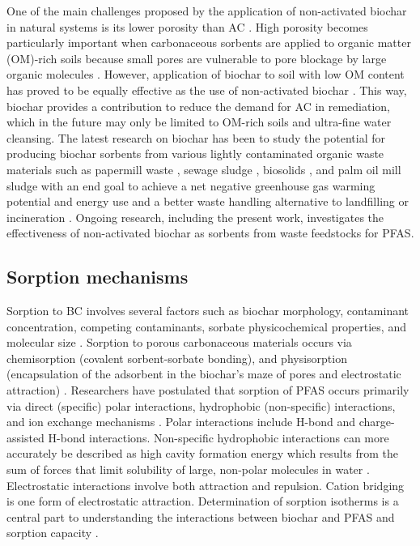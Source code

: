 One of the main challenges proposed by the application of non-activated biochar in natural systems is its lower porosity than AC \citep{leng2021overview}. High porosity becomes particularly important when carbonaceous sorbents are applied to organic matter (\acrshort{OM})-rich soils because small pores are vulnerable to pore blockage by large organic molecules \citep{Sorengard2019}. However, application of biochar to soil with low OM content has proved to be equally effective as the use of non-activated biochar \citep{Alhashimi2017}. This way, biochar provides a contribution to reduce the demand for AC in remediation, which in the future may only be limited to OM-rich soils and ultra-fine water cleansing. The latest research on biochar has been to study the potential for producing biochar sorbents from various lightly contaminated organic waste materials such as papermill waste \citep{van2010effects}, sewage sludge \citep{fathianpour2018lead}, biosolids \citep{wang2011}, and palm oil mill sludge \citep{lam2017adsorption} with an end goal to achieve a net negative greenhouse gas warming potential and energy use and a better waste handling alternative to landfilling or incineration \citep{Alhashimi2017}. Ongoing research, including the present work, investigates the effectiveness of non-activated biochar as sorbents from waste feedstocks for PFAS. 

\subsection{Sorption mechanisms}\label{sec:mechanisms}
Sorption to \acrshort{BC} involves several factors such as biochar morphology, contaminant concentration, competing contaminants, sorbate physicochemical properties, and molecular size \citep{Li2019,du2014adsorption}. Sorption to porous carbonaceous materials occurs via chemisorption (covalent sorbent-sorbate bonding), and physisorption (encapsulation of the adsorbent in the biochar's maze of pores and electrostatic attraction) \citep{Li2019}. Researchers have postulated that sorption of PFAS occurs primarily via direct (specific) polar interactions, hydrophobic (non-specific) interactions, and ion exchange mechanisms \citep{Hale2017fire,yu2009sorption}. Polar interactions include H-bond and charge-assisted H-bond interactions. Non-specific hydrophobic interactions can more accurately be described as high cavity formation energy which results from the sum of forces that limit solubility of large, non-polar molecules in water \citep{Arp2006,sigmund2022sorption}. Electrostatic interactions involve both attraction and repulsion. Cation bridging is one form of electrostatic attraction. Determination of sorption isotherms is a central part to understanding the interactions between biochar and PFAS and sorption capacity \citep{yu2009sorption,Li2019}.

